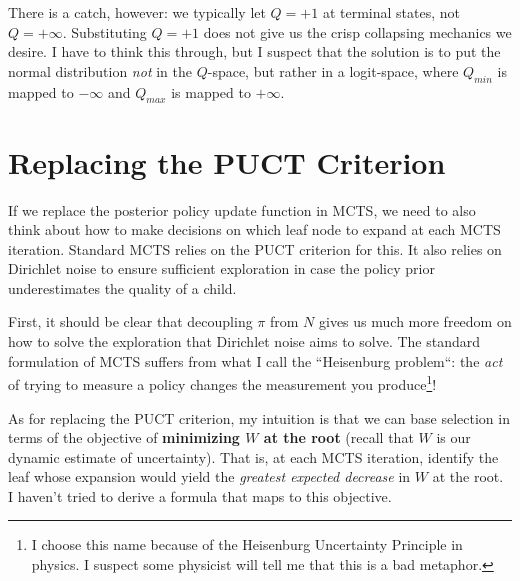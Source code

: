 \documentclass[tikz]{article}
\begin{document}
There is a catch, however: we typically let $Q=+1$ at terminal states, not $Q = +\infty$. Substituting $Q=+1$ does not give us the
crisp collapsing mechanics we desire. I have to think this through, but I suspect that the solution is to put the normal distribution \textit{not}
in the $Q$-space, but rather in a logit-space, where $Q_{min}$ is mapped to $-\infty$ and $Q_{max}$ is mapped to $+\infty$.

\section{Replacing the PUCT Criterion}

If we replace the posterior policy update function in MCTS, we need to also think about how to make decisions on which leaf node to expand
at each MCTS iteration. Standard MCTS relies on the PUCT criterion for this. It also relies on Dirichlet noise to ensure sufficient
exploration in case the policy prior underestimates the quality of a child. \newline

First, it should be clear that decoupling $\pi$ from $N$ gives us much more freedom on how to solve the exploration
that Dirichlet noise aims to solve. The standard formulation of MCTS suffers from what I call the ``Heisenburg problem``: the \textit{act}
of trying to measure a policy changes the measurement you produce\footnote{I choose this name because of the Heisenburg Uncertainty Principle in 
physics. I suspect some physicist will tell me that this is a bad metaphor.}! \newline

As for replacing the PUCT criterion, my intuition is that we can base selection in terms of the objective of \textbf{minimizing $W$ at the root}
(recall that $W$ is our dynamic estimate of uncertainty).
That is, at each MCTS iteration, identify the leaf whose expansion would yield the \textit{greatest expected decrease} in $W$ at the root.
I haven't tried to derive a formula that maps to this objective.
\end{document}
